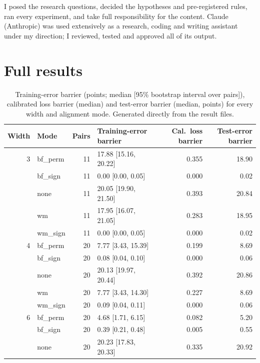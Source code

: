 \documentclass[11pt]{article}
\newcommand{\md}[1]{\textsf{#1}}
\begin{document}
I posed the research questions, decided the hypotheses and pre-registered rules, ran every experiment, and take full responsibility for the content. Claude (Anthropic) was used extensively as a research, coding and writing assistant under my direction; I reviewed, tested and approved all of its output.

\renewcommand{\bibfont}{\small}
\setlength{\bibsep}{3pt}



\clearpage
\appendix

\section{Full results}
\label{app:tables}

\begin{table}[H]
\centering
\small
\caption{Training-error barrier (points; median [95\% bootstrap interval over pairs]), calibrated loss barrier (median) and test-error barrier (median, points) for every width and alignment mode. Generated directly from the result files.}
\label{tab:full}
\begin{tabular}{@{}rlrlrr@{}}
\toprule
Width & Mode & Pairs & Training-error barrier & Cal.\ loss barrier & Test-error barrier \\
\midrule
3 & \md{bf\_perm} & 11 & 17.88 [15.16, 20.22] & 0.355 & 18.90 \\
 & \md{bf\_sign} & 11 & 0.00 [0.00, 0.05] & 0.000 & 0.02 \\
 & \md{none} & 11 & 20.05 [19.90, 21.50] & 0.393 & 20.84 \\
 & \md{wm} & 11 & 17.95 [16.07, 21.05] & 0.283 & 18.95 \\
 & \md{wm\_sign} & 11 & 0.00 [0.00, 0.05] & 0.000 & 0.02 \\
\midrule
4 & \md{bf\_perm} & 20 & 7.77 [3.43, 15.39] & 0.199 & 8.69 \\
 & \md{bf\_sign} & 20 & 0.08 [0.04, 0.10] & 0.000 & 0.06 \\
 & \md{none} & 20 & 20.13 [19.97, 20.44] & 0.392 & 20.86 \\
 & \md{wm} & 20 & 7.77 [3.43, 14.30] & 0.227 & 8.69 \\
 & \md{wm\_sign} & 20 & 0.09 [0.04, 0.11] & 0.000 & 0.06 \\
\midrule
6 & \md{bf\_perm} & 20 & 4.68 [1.71, 6.15] & 0.082 & 5.20 \\
 & \md{bf\_sign} & 20 & 0.39 [0.21, 0.48] & 0.005 & 0.55 \\
 & \md{none} & 20 & 20.23 [17.83, 20.33] & 0.335 & 20.92 \\

\end{tabular}
\end{table}
\end{document}

